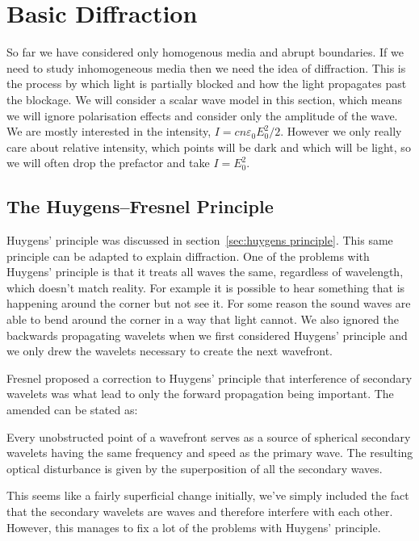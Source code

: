 \documentclass[a4paper]{article}
\begin{document}
    \section{Basic Diffraction}
    So far we have considered only homogenous media and abrupt boundaries.
    If we need to study inhomogeneous media then we need the idea of diffraction.
    This is the process by which light is partially blocked and how the light propagates past the blockage.
    We will consider a scalar wave model in this section, which means we will ignore polarisation effects and consider only the amplitude of the wave.
    We are mostly interested in the intensity, \(I = cn\varepsilon_0E_0^2/2\).
    However we only really care about relative intensity, which points will be dark and which will be light, so we will often drop the prefactor and take \(I = E_0^2\).
    
    \subsection{The Huygens--Fresnel Principle}
    Huygens' principle was discussed in section~\ref{sec:huygens principle}.
    This same principle can be adapted to explain diffraction.
    One of the problems with Huygens' principle is that it treats all waves the same, regardless of wavelength, which doesn't match reality.
    For example it is possible to hear something that is happening around the corner but not see it.
    For some reason the sound waves are able to bend around the corner in a way that light cannot.
    We also ignored the backwards propagating wavelets when we first considered Huygens' principle and we only drew the wavelets necessary to create the next wavefront.
    
    Fresnel proposed a correction to Huygens' principle that interference of secondary wavelets was what lead to only the forward propagation being important.
    The amended  can be stated as:
    \begin{displayquote}
        Every unobstructed point of a wavefront serves as a source of spherical secondary wavelets having the same frequency and speed as the primary wave. The resulting optical disturbance is given by the superposition of all the secondary waves.
    \end{displayquote}
    This seems like a fairly superficial change initially, we've simply included the fact that the secondary wavelets are waves and therefore interfere with each other.
    However, this manages to fix a lot of the problems with Huygens' principle.
    
\end{document}
